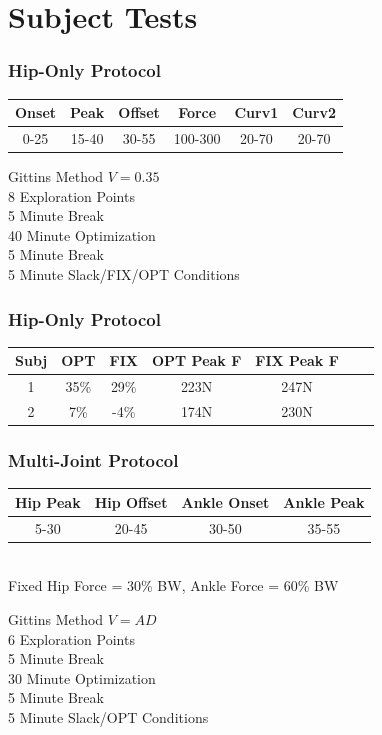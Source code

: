 \documentclass[compress, xcolor=pst]{beamer}
\begin{document}
\section{Subject Tests}
\begin{frame}
	\frametitle{\textbf{Hip-Only Protocol}}
	\begin{table}
	\centering
	\begin{tabular}{ |c|c|c|c|c|c| } 
	 \hline
	 Onset & Peak & Offset & Force & Curv1 & Curv2\\ 
	 \hline
	 0-25 & 15-40 & 30-55 & 100-300 & 20-70 & 20-70\\
	 \hline
	\end{tabular}
	\end{table}
	\begin{center}
	Gittins Method $V = 0.35$\\
	8 Exploration Points\\
	5 Minute Break\\
	40 Minute Optimization\\
	5 Minute Break\\
	5 Minute Slack/FIX/OPT Conditions
	\end{center}
\end{frame}

\begin{frame}
	\frametitle{\textbf{Hip-Only Protocol}}
	\begin{table}
	\centering
	\begin{tabular}{ |c|c|c|c|c|c|c| } 
	 \hline
	 Subj & OPT & FIX & OPT Peak F & FIX Peak F\\ 
	 \hline
	 1 & 35\% & 29\% & 223N & 247N\\
	 2 & 7\% & -4\% & 174N & 230N \\
	 \hline
	\end{tabular}
	\end{table}
\end{frame}

\begin{frame}
	\frametitle{\textbf{Multi-Joint Protocol}}
	\begin{table}
	\centering
	\begin{tabular}{ |c|c|c|c| } 
	 \hline
	 Hip Peak & Hip Offset & Ankle Onset & Ankle Peak\\ 
	 \hline
	 5-30 & 20-45 & 30-50 & 35-55\\
	 \hline
	\end{tabular}\\
		Fixed Hip Force = 30\% BW, Ankle Force = 60\% BW
	\end{table}
	\begin{center}
		Gittins Method $V=AD$\\
		6 Exploration Points\\
		5 Minute Break\\
		30 Minute Optimization\\
		5 Minute Break\\
		5 Minute Slack/OPT Conditions
	\end{center}
\end{frame}
\end{document}
